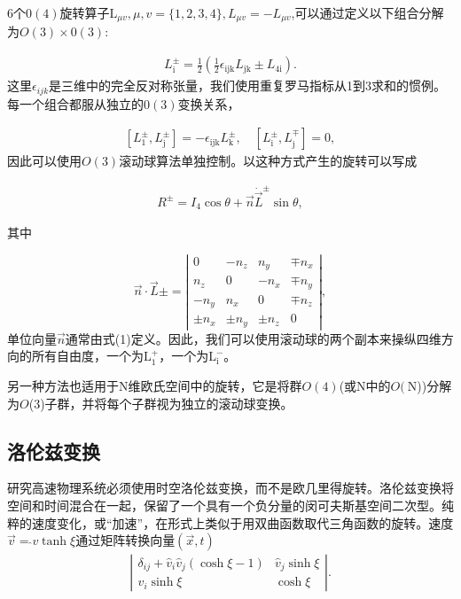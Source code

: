 \begin{CJK}{UTF8}{gbsn}
6个$0(4)$旋转算子$\mathrm{L}_{\mu v}, \mu, v=\{1,2,3,4\}, L_{\mu v}=-L_{\mu v}$,可以通过定义以下组合分解为$O (3) \times 0 (3)$:

\begin{align}
L_{\mathrm{i}}^{\pm}=\frac{1}{2}\left(\frac{1}{2} \epsilon_{\mathrm{ijk}} L_{\mathrm{jk}} \pm L_{4 \mathrm{i}}\right) .
\end{align}
这里$\epsilon_{i j k}$是三维中的完全反对称张量，我们使用重复罗马指标从1到3求和的惯例。每一个组合都服从独立的$0(3)$变换关系，

\begin{align}
\left[L_{1}^{\pm}, L_{\mathrm{j}}^{\pm}\right]=-\epsilon_{\mathrm{ijk}} L_{\mathrm{k}}^{\pm}, \quad\left[L_{\mathrm{i}}^{\pm}, L_{\mathrm{j}}^{\mp}\right]=0,
\end{align}
因此可以使用$O(3)$滚动球算法单独控制。以这种方式产生的旋转可以写成

\begin{align}
R^{\pm}=I_{4} \cos \theta+\vec{n} \dot \vec{L}^{\pm} \sin \theta,
\end{align}


其中

$$
\vec{n} \cdot \vec{L} \pm=\left|\begin{array}{cccc}
0 & -n_{z} & n_{y} & \mp n_{x} \\
n_{z} & 0 & -n_{x} & \mp n_{y} \\
-n_{y} & n_{x} & 0 & \mp n_{z} \\
\pm n_{x} & \pm n_{y} & \pm n_{z} & 0
\end{array}\right|,
$$
单位向量$\vec{n}$通常由式(1)定义。因此，我们可以使用滚动球的两个副本来操纵四维方向的所有自由度，一个为$\mathrm{L}_{1}^{+}$，一个为$\mathrm{L}_{\mathrm{i}}^{-}$。


另一种方法也适用于N维欧氏空间中的旋转，它是将群$O(4)$(或$\mathrm{N}$中的$O(\mathrm{~N}$))分解为$O$(3)子群，并将每个子群视为独立的滚动球变换。

\subsection*{洛伦兹变换}
研究高速物理系统必须使用时空洛伦兹变换，而不是欧几里得旋转。洛伦兹变换将空间和时间混合在一起，保留了一个具有一个负分量的闵可夫斯基空间二次型。纯粹的速度变化，或“加速”，在形式上类似于用双曲函数取代三角函数的旋转。速度$\vec{v}=\hat{} v \tanh \xi$通过矩阵转换向量$(\vec{x},t)$
\begin{align}
\left|\begin{array}{cc}
\delta_{i j}+\hat{v}_{i} \hat{v}_{j}(\cosh \xi-1) & \hat{v}_{j} \sinh \xi \\
\hat{v}_{i} \sinh \xi & \cosh \xi
\end{array}\right| .
\end{align}


\end{CJK}
